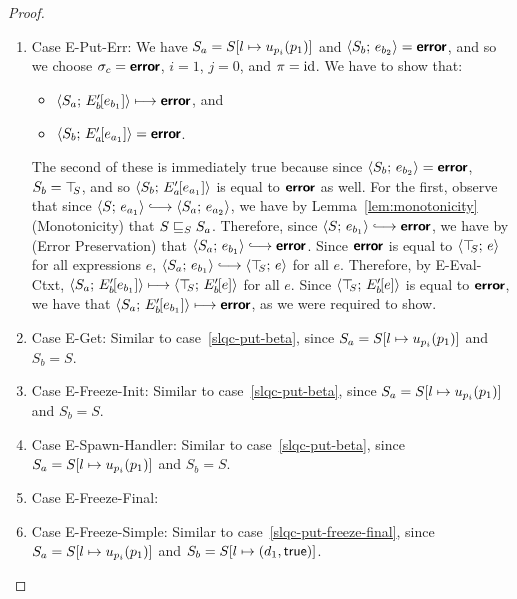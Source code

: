 \begin{proof}
\begin{enumerate}
\begin{enumerate}
\begin{itemize}
      \end{itemize}

    \item \label{slqc-put-put-err}Case {\sc E-Put-Err}: We have $S_a =
      S[l \mapsto u_{p_i}(p_1)]$ and $\langle S_b;\, e_{b_2} \rangle =
      \textbf{\textsf{error}}$, and so we choose $\sigma_c = \textbf{\textsf{error}}$, $i = 1$, $j = 0$,
      and $\pi = \mathrm{id}$.  We have to show that:
      \begin{itemize}
      \item $\langle S_a;\, E'_b\hspace{-1mm}\left[e_{b_1}\right] \rangle \longmapsto
        \textbf{\textsf{error}}$, and
      \item
        $\langle S_b;\, E'_a\hspace{-1mm}\left[e_{a_1}\right] \rangle = \textbf{\textsf{error}}$.
      \end{itemize}

      The second of these is immediately true because since
      $\langle S_b;\, e_{b_2} \rangle = \textbf{\textsf{error}}$, $S_b = \top\hspace{-0.85mm}_{S}$, and so
      $\langle S_b;\, E'_a\hspace{-1mm}\left[e_{a_1}\right] \rangle$ is equal to $\textbf{\textsf{error}}$ as
      well.  For the first, observe that since $\config{S}{e_{a_1}}
      \parstepsto \config{S_a}{e_{a_2}}$, we have by
      Lemma~\ref{lem:monotonicity} (Monotonicity) that
      $S \sqsubseteq_S S_a$.  Therefore, since $\config{S}{e_{b_1}}
      \parstepsto \error$, we have by
      (Error Preservation)
      that $\config{S_a}{e_{b_1}} \parstepsto \error$.  Since $\textbf{\textsf{error}}$
      is equal to $\langle \top\hspace{-0.85mm}_{S};\, e \rangle$ for all expressions $e$,
      $\config{S_a}{e_{b_1}} \parstepsto \config{\topS}{e}$ for all
      $e$.  Therefore, by {\sc E-Eval-Ctxt},
      $\langle S_a;\, E'_b\hspace{-1mm}\left[e_{b_1}\right] \rangle \longmapsto
      \langle \top\hspace{-0.85mm}_{S};\, E'_b\hspace{-1mm}\left[e\right] \rangle$ for all $e$.  Since
      $\langle \top\hspace{-0.85mm}_{S};\, E'_b\hspace{-1mm}\left[e\right] \rangle$ is equal to $\textbf{\textsf{error}}$, we
      have that $\langle S_a;\, E'_b\hspace{-1mm}\left[e_{b_1}\right] \rangle \longmapsto
      \textbf{\textsf{error}}$, as we were required to show.

    \item \label{slqc-put-get}Case {\sc E-Get}: Similar to
      case~\ref{slqc-put-beta}, since $S_a =
      S[l \mapsto u_{p_i}(p_1)]$ and $S_b = S$.
    \item \label{slqc-put-freeze-init}Case {\sc E-Freeze-Init}:
      Similar to case~\ref{slqc-put-beta}, since $S_a =
      S[l \mapsto u_{p_i}(p_1)]$ and $S_b = S$.
    \item \label{slqc-put-spawn-handler}Case {\sc E-Spawn-Handler}:
      Similar to case~\ref{slqc-put-beta}, since $S_a =
      S[l \mapsto u_{p_i}(p_1)]$ and $S_b = S$.
    \item \label{slqc-put-freeze-final}Case {\sc E-Freeze-Final}: \TODO{}
    \item \label{slqc-put-freeze-simple}Case {\sc E-Freeze-Simple}:
      Similar to case~\ref{slqc-put-freeze-final}, since $S_a =
      S[l \mapsto u_{p_i}(p_1)]$ and $S_b =
      S[l \mapsto (d_1, \textsf{true})]$.


\end{enumerate}
\end{enumerate}
\end{proof}
